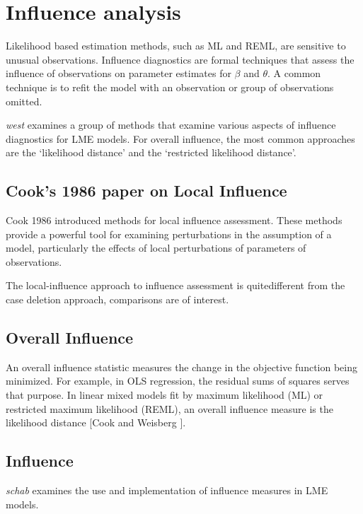 \documentclass[00-MASTER.tex]{subfiles}
\begin{document}
	\newpage
	\section{Influence analysis} %
	
	Likelihood based estimation methods, such as ML and REML, are sensitive to unusual observations. Influence diagnostics are formal techniques that assess the influence of observations on parameter estimates for $\beta$ and $\theta$. A common technique is to refit the model with an observation or group of observations omitted.
	
	\emph{west} examines a group of methods that examine various aspects of influence diagnostics for LME models.
	For overall influence, the most common approaches are the `likelihood distance' and the `restricted likelihood distance'.
	
	\subsection{Cook's 1986 paper on Local Influence}%
	Cook 1986 introduced methods for local influence assessment. These methods provide a powerful tool for examining perturbations in the assumption of a model, particularly the effects of local perturbations of parameters of observations.
	
	The local-influence approach to influence assessment is quitedifferent from the case deletion approach, comparisons are of
	interest.
	
	
	
	\subsection{Overall Influence}
	An overall influence statistic measures the change in the objective function being minimized. For example, in
	OLS regression, the residual sums of squares serves that purpose. In linear mixed models fit by
	 maximum likelihood (ML) or  restricted maximum likelihood (REML), an overall influence measure is the  likelihood distance [Cook and Weisberg ].
	
	
	\subsection{Influence}
	
	\emph{schab} examines the use and implementation of
	influence measures in LME models.
	
\end{document}
